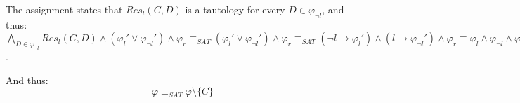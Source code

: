 \documentclass[a4paper,12pt]{article} %
\begin{document}
The assignment states that $Res_l(C, D)$ is a tautology for every $D \in \varphi_{\neg l}$, and thus: $\bigwedge_{D \in \varphi_{\neg l}} Res_l(C, D) \wedge (\varphi_l' \vee \varphi_{\neg l}') \wedge \varphi_r \equiv_{SAT} (\varphi_l' \vee \varphi_{\neg l}') \wedge \varphi_r \equiv_{SAT} (\neg l \to \varphi_l') \wedge (l \to \varphi_{\neg l}') \wedge \varphi_r \equiv \varphi_l \wedge \varphi_{\neg l} \wedge \varphi_r = \varphi \setminus \{C\}$.

And thus: $$\varphi \equiv_{SAT} \varphi \setminus \{C\}$$
\end{document}
